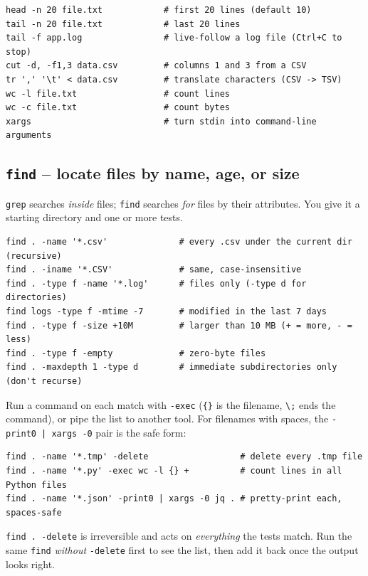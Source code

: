 \documentclass[11pt,a4paper]{article}
\begin{document}
\begin{lstlisting}[style=bashstyle]
head -n 20 file.txt            # first 20 lines (default 10)
tail -n 20 file.txt            # last 20 lines
tail -f app.log                # live-follow a log file (Ctrl+C to stop)
cut -d, -f1,3 data.csv         # columns 1 and 3 from a CSV
tr ',' '\t' < data.csv         # translate characters (CSV -> TSV)
wc -l file.txt                 # count lines
wc -c file.txt                 # count bytes
xargs                          # turn stdin into command-line arguments
\end{lstlisting}

\subsection*{\texttt{find} -- locate files by name, age, or size}

\texttt{grep} searches \emph{inside} files; \texttt{find} searches
\emph{for} files by their attributes. You give it a starting
directory and one or more tests.

\begin{lstlisting}[style=bashstyle]
find . -name '*.csv'              # every .csv under the current dir (recursive)
find . -iname '*.CSV'             # same, case-insensitive
find . -type f -name '*.log'      # files only (-type d for directories)
find logs -type f -mtime -7       # modified in the last 7 days
find . -type f -size +10M         # larger than 10 MB (+ = more, - = less)
find . -type f -empty             # zero-byte files
find . -maxdepth 1 -type d        # immediate subdirectories only (don't recurse)
\end{lstlisting}

Run a command on each match with \texttt{-exec} (\texttt{\{\}} is the
filename, \texttt{\textbackslash;} ends the command), or pipe the list
to another tool. For filenames with spaces, the \texttt{-print0 | xargs
-0} pair is the safe form:

\begin{lstlisting}[style=bashstyle]
find . -name '*.tmp' -delete                  # delete every .tmp file
find . -name '*.py' -exec wc -l {} +          # count lines in all Python files
find . -name '*.json' -print0 | xargs -0 jq . # pretty-print each, spaces-safe
\end{lstlisting}

\begin{gotcha}
\texttt{find . -delete} is irreversible and acts on \emph{everything}
the tests match. Run the same \texttt{find} \emph{without}
\texttt{-delete} first to see the list, then add it back once the
output looks right.
\end{gotcha}
\end{document}
